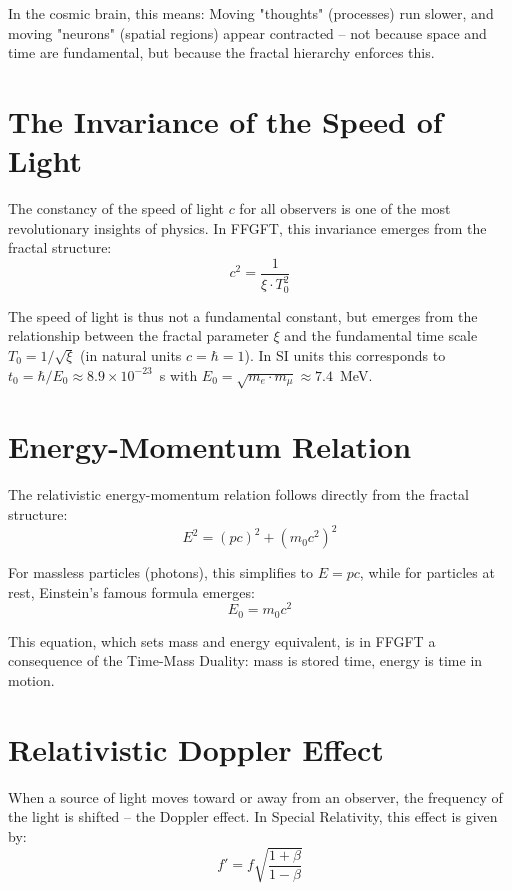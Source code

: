 In the cosmic brain, this means: Moving "thoughts" (processes) run slower, and moving "neurons" (spatial regions) appear contracted -- not because space and time are fundamental, but because the fractal hierarchy enforces this.

\section{The Invariance of the Speed of Light}

The constancy of the speed of light $c$ for all observers is one of the most revolutionary insights of physics. In FFGFT, this invariance emerges from the fractal structure:
\begin{equation}
c^2 = \frac{1}{\xi \cdot T_0^2}
\end{equation}

The speed of light is thus not a fundamental constant, but emerges from the relationship between the fractal parameter $\xi$ and the fundamental time scale $T_0 = 1/\sqrt{\xi}$ (in natural units $c = \hbar = 1$). In SI units this corresponds to $t_0 = \hbar/E_0 \approx 8.9 \times 10^{-23}$~s with $E_0 = \sqrt{m_e \cdot m_\mu} \approx 7.4$~MeV.

\section{Energy-Momentum Relation}

The relativistic energy-momentum relation follows directly from the fractal structure:
\begin{equation}
E^2 = (pc)^2 + (m_0c^2)^2
\end{equation}

For massless particles (photons), this simplifies to $E = pc$, while for particles at rest, Einstein's famous formula emerges:
\begin{equation}
E_0 = m_0c^2
\end{equation}

This equation, which sets mass and energy equivalent, is in FFGFT a consequence of the Time-Mass Duality: mass is stored time, energy is time in motion.

\section{Relativistic Doppler Effect}

When a source of light moves toward or away from an observer, the frequency of the light is shifted -- the Doppler effect. In Special Relativity, this effect is given by:
\begin{equation}
f' = f \sqrt{\frac{1 + \beta}{1 - \beta}}
\end{equation}


